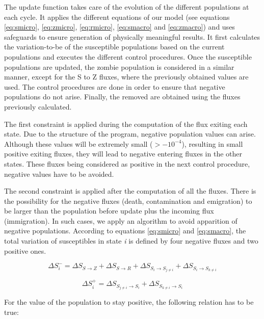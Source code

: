\documentclass[11pt]{article} %
\begin{document}
The update function takes care of the evolution of the different populations at each cycle. It applies the different equations of our model (see equations \eqref{eq:smicro}, \eqref{eq:zmicro}, \eqref{eq:rmicro}, \eqref{eq:smacro} and \eqref{eq:zmacro}) and uses safeguards to ensure generation of physically meaningful results. It first calculates the variation-to-be of the susceptible populations based on the current populations and executes the different control procedures. Once the susceptible populations are updated, the zombie population is considered in a similar manner, except for the S to Z fluxes, where the previously obtained values are used. The control procedures are done in order to ensure that negative populations do not arise. Finally, the removed are obtained using the fluxes previously calculated.

The first constraint is applied during the computation of the flux exiting each state. Due to the structure of the program, negative population values can arise. Although these values will be extremely small ($> - 10^{-4}$), resulting in small positive exiting fluxes, they will lead to negative entering fluxes in the other states. These fluxes being considered as positive in the next control procedure, negative values have to be avoided.

The second constraint is applied after the computation of all the fluxes. There is the possibility for the negative fluxes (death, contamination and emigration) to be larger than the population before update plus the incoming flux (immigration). In such cases, we apply an algorithm to avoid apparition of negative populations. According to equations \eqref{eq:smicro} and \eqref{eq:smacro}, the total variation of susceptibles in state \textit{i} is defined by four negative fluxes and two positive ones.

\bigskip
\begin{equation} \label{eq:delta-}
\Delta S_i^- = \Delta S_{S\rightarrow Z} + \Delta S_{S\rightarrow R} + \Delta S_{S_i\rightarrow S_{j\neq i}} + \Delta S_{S_i\rightarrow S_{k\neq i}}
\end{equation}

\begin{equation} \label{eq:delta+}
\Delta S_i^+ = \Delta S_{S_{j\neq i}\rightarrow S_i} + \Delta S_{S_{k\neq i}\rightarrow S_i}
\end{equation}
\bigskip

For the value of the population to stay positive, the following relation has to be true:
\end{document}

